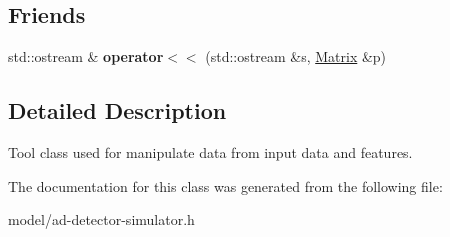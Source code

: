 \subsection*{Friends}
\begin{DoxyCompactItemize}
\item 
\hypertarget{classns3_1_1Matrix_a5ac1143f9f2df2f556d21e1f16891b52}{}std\+::ostream \& {\bfseries operator$<$$<$} (std\+::ostream \&s, \hyperlink{classns3_1_1Matrix}{Matrix} \&p)\label{classns3_1_1Matrix_a5ac1143f9f2df2f556d21e1f16891b52}

\end{DoxyCompactItemize}


\subsection{Detailed Description}
Tool class used for manipulate data from input data and features. 

The documentation for this class was generated from the following file\+:\begin{DoxyCompactItemize}
\item 
model/ad-\/detector-\/simulator.\+h\end{DoxyCompactItemize}
